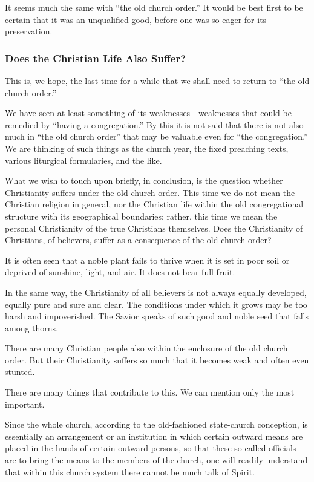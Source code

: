It seems much the same with “the old church order.” It would be best first to be certain that it was an unqualified good, before one was so eager for its preservation.


\subsubsection{Does the Christian Life Also Suffer?}

This is, we hope, the last time for a while that we shall need to return to “the old church order.”

We have seen at least something of its weaknesses—weaknesses that could be remedied by “having a congregation.” By this it is not said that there is not also much in “the old church order” that may be valuable even for “the congregation.” We are thinking of such things as the church year, the fixed preaching texts, various liturgical formularies, and the like.

What we wish to touch upon briefly, in conclusion, is the question whether Christianity suffers under the old church order. This time we do not mean the Christian religion in general, nor the Christian life within the old congregational structure with its geographical boundaries; rather, this time we mean the personal Christianity of the true Christians themselves. Does the Christianity of Christians, of believers, suffer as a consequence of the old church order?

It is often seen that a noble plant fails to thrive when it is set in poor soil or deprived of sunshine, light, and air. It does not bear full fruit.

In the same way, the Christianity of all believers is not always equally developed, equally pure and sure and clear. The conditions under which it grows may be too harsh and impoverished. The Savior speaks of such good and noble seed that falls among thorns.

There are many Christian people also within the enclosure of the old church order. But their Christianity suffers so much that it becomes weak and often even stunted.

There are many things that contribute to this. We can mention only the most important.

Since the whole church, according to the old-fashioned state-church conception, is essentially an arrangement or an institution in which certain outward means are placed in the hands of certain outward persons, so that these so-called officials are to bring the means to the members of the church, one will readily understand that within this church system there cannot be much talk of Spirit.

